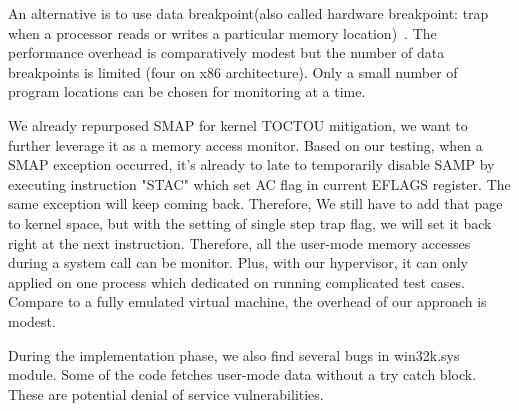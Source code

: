 An alternative is to use data breakpoint(also called hardware breakpoint: trap when a processor reads or writes a particular memory location)~\cite{erickson2010effective}. The performance overhead is comparatively modest but the number of data breakpoints is limited (four on x86 architecture). Only a small number of program locations can be chosen for monitoring at a time.



We already repurposed SMAP for kernel TOCTOU mitigation, we want to further leverage it as a memory access monitor. Based on our testing, when a SMAP exception occurred, it's already to late to temporarily disable SAMP by executing instruction "STAC" which set AC flag in current EFLAGS register. The same exception will keep coming back. Therefore, We still have to add that page to kernel space, but with the setting of single step trap flag, we will set it back right at the next instruction. Therefore, all the user-mode memory accesses during a system call can be monitor. Plus, with our hypervisor, it can only applied on one process which dedicated on running complicated test cases. Compare to a fully emulated virtual machine, the overhead of our approach is modest.

During the implementation phase, we also find several bugs in win32k.sys module. Some of the code fetches user-mode data without a try catch block. These are potential denial of service vulnerabilities.